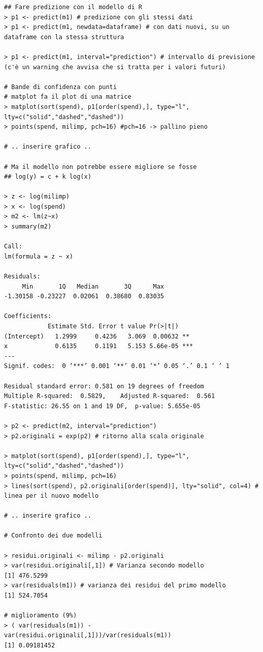 \begin{verbatim}
## Fare predizione con il modello di R
> p1 <- predict(m1) # predizione con gli stessi dati
> p1 <- predict(m1, newdata=dataframe) # con dati nuovi, su un dataframe con la stessa struttura

> p1 <- predict(m1, interval="prediction") # intervallo di previsione (c'è un warning che avvisa che si tratta per i valori futuri)

# Bande di confidenza con punti
# matplot fa il plot di una matrice
> matplot(sort(spend), p1[order(spend),], type="l", lty=c("solid","dashed","dashed"))
> points(spend, milimp, pch=16) #pch=16 -> pallino pieno

# .. inserire grafico ..

# Ma il modello non potrebbe essere migliore se fosse
## log(y) = c + k log(x)

> z <- log(milimp)
> x <- log(spend)
> m2 <- lm(z~x)
> summary(m2)

Call:
lm(formula = z ~ x)

Residuals:
     Min       1Q   Median       3Q      Max 
-1.30158 -0.23227  0.02061  0.38680  0.83035 

Coefficients:
            Estimate Std. Error t value Pr(>|t|)    
(Intercept)   1.2999     0.4236   3.069  0.00632 ** 
x             0.6135     0.1191   5.153 5.66e-05 ***
---
Signif. codes:  0 ‘***’ 0.001 ‘**’ 0.01 ‘*’ 0.05 ‘.’ 0.1 ‘ ’ 1

Residual standard error: 0.581 on 19 degrees of freedom
Multiple R-squared:  0.5829,    Adjusted R-squared:  0.561 
F-statistic: 26.55 on 1 and 19 DF,  p-value: 5.655e-05

> p2 <- predict(m2, interval="prediction")
> p2.originali = exp(p2) # ritorno alla scala originale

> matplot(sort(spend), p1[order(spend),], type="l", lty=c("solid","dashed","dashed"))
> points(spend, milimp, pch=16)
> lines(sort(spend), p2.originali[order(spend)], lty="solid", col=4) # linea per il nuovo modello

# .. inserire grafico ..

# Confronto dei due modelli

> residui.originali <- milimp - p2.originali
> var(residui.originali[,1]) # Varianza secondo modello
[1] 476.5299
> var(residuals(m1)) # varianza dei residui del primo modello
[1] 524.7054

# miglioramento (9%)
> ( var(residuals(m1)) - var(residui.originali[,1]))/var(residuals(m1))
[1] 0.09181452


\end{verbatim}
